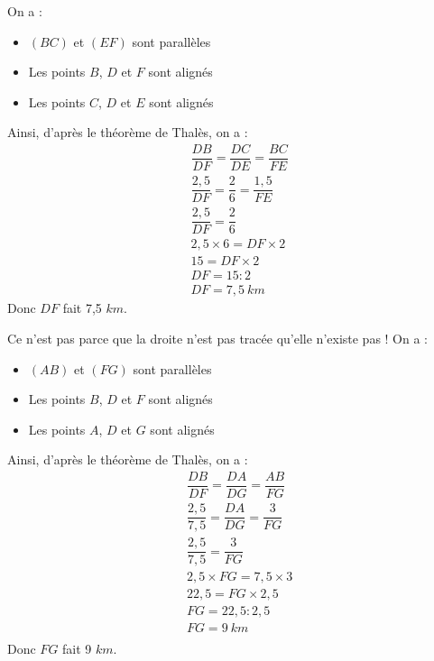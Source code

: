 \newpage



\begin{multicols}{2}
\cnt On a :
\begin{itemize}
  \item $(BC)$ et $(EF)$ sont parallèles
  \item Les points $B$, $D$ et $F$ sont alignés
  \item Les points $C$, $D$ et $E$ sont alignés
\end{itemize}
Ainsi, d'après le théorème de Thalès, on a :
\begin{align*}
  &\dfrac{DB}{DF}=\dfrac{DC}{DE}=\dfrac{BC}{FE}\\
  &\dfrac{2,5}{DF}=\dfrac{2}{6}=\dfrac{1,5}{FE}\\
  &\dfrac{2,5}{DF}=\dfrac{2}{6}\\
  &2,5\times 6=DF\times 2\\
  &15=DF\times 2\\
  &DF=15:2\\
  &DF=7,5~km
\end{align*}
Donc $DF$ fait 7,5 $km$.
\columnbreak

\cnt Ce n'est pas parce que la droite n'est pas tracée qu'elle n'existe pas ! On a :
\begin{itemize}
  \item $(AB)$ et $(FG)$ sont parallèles
  \item Les points $B$, $D$ et $F$ sont alignés
  \item Les points $A$, $D$ et $G$ sont alignés
\end{itemize}
Ainsi, d'après le théorème de Thalès, on a :
\begin{align*}
  &\dfrac{DB}{DF}=\dfrac{DA}{DG}=\dfrac{AB}{FG}\\
  &\dfrac{2,5}{7,5}=\dfrac{DA}{DG}=\dfrac{3}{FG}\\
  &\dfrac{2,5}{7,5}=\dfrac{3}{FG}\\
  &2,5\times FG=7,5\times 3\\
  &22,5=FG\times 2,5\\
  &FG=22,5:2,5\\
  &FG=9~km\\
\end{align*}
Donc $FG$ fait 9 $km$.
\end{multicols}

\vspace{1em}

